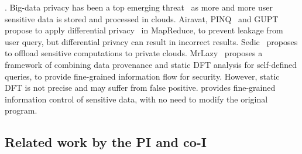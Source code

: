 . Big-data privacy has been a top 
emerging threat~\cite{top-threats-nine, kazim2015survey} as more and more user 
sensitive data is stored and processed in clouds. 
Airavat\cite{airavat:nsdi10}, PINQ~\cite{pinq:sigmod09} and 
GUPT~\cite{gupt:sigmod12} propose to apply differential 
privacy~\cite{noise:tcc06} in MapReduce,
to prevent leakage from user query, but differential privacy can result in 
incorrect results. Sedic~\cite{sedic:cloud13} proposes to offload sensitive 
computations to private clouds. MrLazy~\cite{hotcloud14:mrlazy}
proposes a framework of combining data provenance and static DFT analysis for 
self-defined queries, to provide fine-grained information flow for security. 
However, static DFT is not precise and may suffer from false positive. \kakute 
provides fine-grained information control of sensitive data, with no need to 
modify the original program.



\vspace{-.15in}\subsection{Related work by the PI and co-I} 
\label{sec:my-work}\vspace{-.075in}
% 

